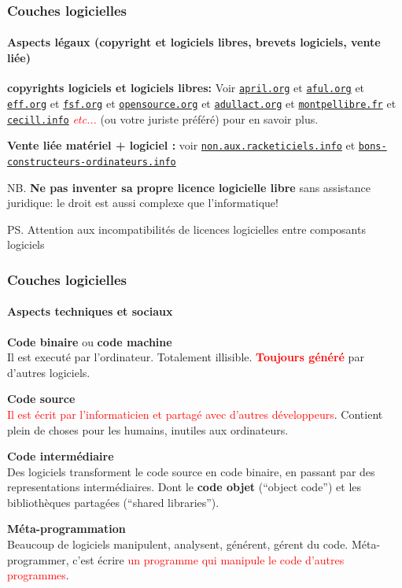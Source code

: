 \documentclass[xcolor=svgnames,final,smaller,a4]{beamer}
\begin{document}
\begin{frame}
  \frametitle{Couches logicielles}
  \framesubtitle{Aspects légaux (copyright et logiciels libres, brevets logiciels, vente liée)}

  \textbf{copyrights logiciels et logiciels libres:} Voir
  \href{https://april.org/}{\texttt{april.org}} et
  \href{https://aful.org/}{\texttt{aful.org}} et
  \href{https://www.eff.org/}{\texttt{eff.org}} et
  \href{https://www.fsf.org/}{\texttt{fsf.org}} et
  \href{https://opensource.org/}{\texttt{opensource.org}} et
   \href{https://adullact.org/}{\texttt{adullact.org}} et
  \href{https://montpellibre.fr/}{\texttt{montpellibre.fr}} et
   \href{https://cecill.info/}{\texttt{cecill.info}} \textcolor{red}{\textit{etc...}}
  (ou votre juriste préféré)
    pour en savoir
    plus.

    \vspace{0.5cm}
    \textbf{Vente liée matériel + logiciel :} voir
    \href{https://non.aux.racketiciels.info/}{\texttt{non.aux.racketiciels.info}}
    et
    \href{https://bons-constructeurs-ordinateurs.info/}{\texttt{bons-constructeurs-ordinateurs.info}}
    
    \vspace{0.5cm}

    NB. \textbf{Ne pas inventer sa propre licence logicielle libre} sans
    assistance juridique: le droit est aussi complexe que
    l'informatique!
   
    \vspace{0.3cm}
 
    PS. Attention aux incompatibilités de licences logicielles entre composants logiciels
\end{frame}


\begin{frame}
  \frametitle{Couches logicielles}
  \framesubtitle{Aspects techniques et sociaux}

  \textbf{Code binaire} ou \textbf{code machine} \\
  Il est executé par l'ordinateur. Totalement illisible.
  \textcolor{red}{\textbf{Toujours généré}} par d'autres logiciels.

    \vspace{0.3cm}
  \textbf{Code source} \\
  \textcolor{red}{Il est écrit par l'informaticien et partagé avec d'autres développeurs}.
  Contient plein de choses pour les humains, inutiles aux ordinateurs.

    \vspace{0.3cm}
  \textbf{Code intermédiaire} \\
  Des logiciels transforment le code source en code binaire, en passant par des representations intermédiaires. Dont le  \textbf{code objet} (``object code'') et les bibliothèques partagées (``shared libraries'').
  
    \vspace{0.3cm}
    \textbf{Méta-programmation} \\
    Beaucoup de logiciels manipulent, analysent, générent, gérent du code. Méta-programmer, c'est écrire \textcolor{red}{un programme qui manipule le code d'autres programmes}.
\end{frame}
\end{document}
